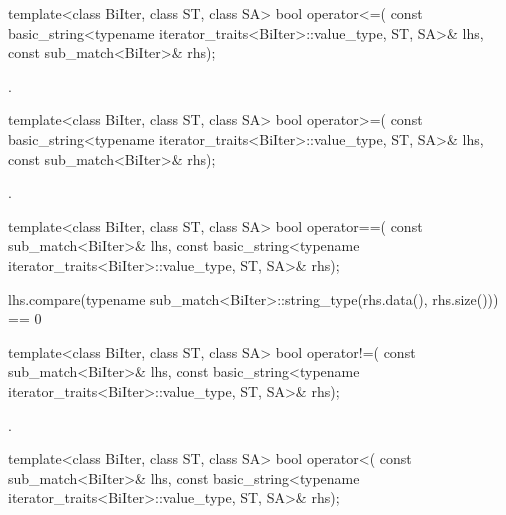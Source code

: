 %
\begin{itemdecl}
template<class BiIter, class ST, class SA>
  bool operator<=(
      const basic_string<typename iterator_traits<BiIter>::value_type, ST, SA>& lhs,
      const sub_match<BiIter>& rhs);
\end{itemdecl}

\begin{itemdescr}
\pnum\returns {}.
\end{itemdescr}

%
\begin{itemdecl}
template<class BiIter, class ST, class SA>
  bool operator>=(
      const basic_string<typename iterator_traits<BiIter>::value_type, ST, SA>& lhs,
      const sub_match<BiIter>& rhs);
\end{itemdecl}

\begin{itemdescr}
\pnum\returns {}.
\end{itemdescr}

%
\begin{itemdecl}
template<class BiIter, class ST, class SA>
  bool operator==(
      const sub_match<BiIter>& lhs,
      const basic_string<typename iterator_traits<BiIter>::value_type, ST, SA>& rhs);
\end{itemdecl}

\begin{itemdescr}
\pnum
\returns
\begin{codeblock}
lhs.compare(typename sub_match<BiIter>::string_type(rhs.data(), rhs.size())) == 0
\end{codeblock}
\end{itemdescr}

%
%
\begin{itemdecl}
template<class BiIter, class ST, class SA>
  bool operator!=(
      const sub_match<BiIter>& lhs,
      const basic_string<typename iterator_traits<BiIter>::value_type, ST, SA>& rhs);
\end{itemdecl}

\begin{itemdescr}
\pnum\returns {}.
\end{itemdescr}

%
%
\begin{itemdecl}
template<class BiIter, class ST, class SA>
  bool operator<(
      const sub_match<BiIter>& lhs,
      const basic_string<typename iterator_traits<BiIter>::value_type, ST, SA>& rhs);
\end{itemdecl}


